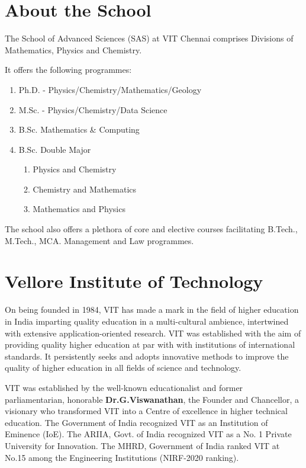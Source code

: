 \section{About the School}

The School of Advanced Sciences (SAS) at VIT Chennai comprises Divisions of Mathematics, Physics and Chemistry.

It offers the following programmes:
\begin{enumerate}[label={\color{primaryColor}\faCheckSquareO}]
	\item Ph.D. - Physics/Chemistry/Mathematics/Geology
	\item M.Sc. - Physics/Chemistry/Data Science
	\item B.Sc. Mathematics \& Computing
	\item B.Sc. Double Major
	\begin{enumerate}[label={\color{primaryColor}\faChevronRight}]
		\item Physics and Chemistry
		\item Chemistry and Mathematics 
		\item Mathematics and Physics  
	\end{enumerate}
\end{enumerate}


The school also offers a plethora of core and elective courses facilitating B.Tech., M.Tech., MCA. Management and Law programmes.

\section{Vellore Institute of Technology}
On being founded in 1984, VIT has made a mark in the field of higher education in India imparting quality education in a multi-cultural ambience, intertwined with extensive application-oriented research.
VIT was established with the aim of providing quality higher education at par with with institutions of international standards. It persistently seeks and adopts innovative methods to improve the quality of higher education in all fields of science and technology. 





VIT was established by the well-known educationalist and former parliamentarian, honorable \textbf{Dr.\;G.\;Viswanathan}, the Founder and Chancellor, a visionary who transformed VIT into a Centre of excellence in higher technical education. The Government of India recognized VIT as an Institution of Eminence (IoE). The ARIIA, Govt. of India recognized VIT as a No. 1 Private University for Innovation. The MHRD, Government of India ranked VIT at No.15 among the Engineering Institutions (NIRF-2020 ranking).
